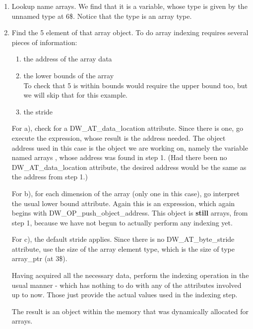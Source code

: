 \begin{enumerate}[1.]

\item Lookup name arrays. We find that it is a variable,
whose type is given by the unnamed type at 6\$. Notice that
the type is an array type.


\item Find the 5 element of that array object. To do array
indexing requires several pieces of information:

\begin{enumerate}[a]

\item  the address of the array data

\item the lower bounds of the array \\
\lbrack To check that 5 is within bounds would require the upper
bound too, but we will skip that for this example. \rbrack

\item the stride 

\end{enumerate}

For a), check for a DW\-\_AT\-\_data\-\_location attribute. Since
there is one, go execute the expression, whose result is
the address needed. The object address used in this case
is the object we are working on, namely the variable named
arrays , whose address was found in step 1. (Had there been
no DW\-\_AT\-\_data\-\_location attribute, the desired address would
be the same as the address from step 1.)

For b), for each dimension of the array (only one
in this case), go interpret the usual lower bound
attribute. Again this is an expression, which again begins
with DW\-\_OP\-\_push\-\_object\-\_address. This object is 
\textbf{still} arrays,
from step 1, because we have not begun to actually perform
any indexing yet.

For c), the default stride applies. Since there is no
DW\-\_AT\-\_byte\-\_stride attribute, use the size of the array element
type, which is the size of type array\_ptr (at 3\$).

Having acquired all the necessary data, perform the indexing
operation in the usual manner -  which has nothing to do with
any of the attributes involved up to now. Those just provide
the actual values used in the indexing step.

The result is an object within the memory that was dynamically
allocated for arrays.


\end{enumerate}

